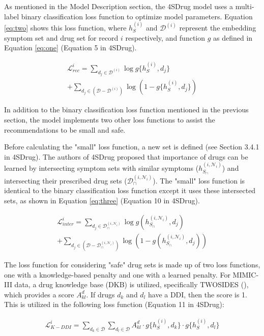 \documentclass[letterpaper]{article} %
\begin{document}
As mentioned in the Model Description section, the 4SDrug model uses a multi-label binary classification loss function to optimize model parameters. Equation \ref{eq:two} shows this loss function, where $h_S^{(i)}$ and $\mathcal{D}^{(i)}$ represent the embedding symptom set and drug set for record $i$ respectively, and function $g$ as defined in Equation \ref{eq:one} (Equation 5 in 4SDrug). 

\begin{multline}
\mathcal{L}_{rec}^{i} = \sum_{d_j\in\mathcal{D}^{(i)}}{\log g\{h_S^{(i)},d_j\}} \quad \\+  \sum_{d_j\in(\mathcal{D}-\mathcal{D}^{(i)})}{\log \left(1-g\{h_S^{(i)},d_j\}\right)}
    \label{eq:two}
\end{multline}

In addition to the binary classification loss function mentioned in the previous section, the model implements two other loss functions to assist the recommendations to be small and safe.

Before calculating the "small" loss function, a new set is defined (see Section 3.4.1 in 4SDrug). The authors of 4SDrug proposed that importance of drugs can be learned by intersecting symptom sets with similar symptoms ($h_{S_{\cap}}^{(i,\mathcal{N}_i)}$) and intersecting their prescribed drug sets ($\mathcal{D}_{\cap}^{(i,\mathcal{N}_i)}$). The "small" loss function is identical to the binary classification loss function except it uses these intersected sets, as shown in Equation \ref{eq:three} (Equation 10 in 4SDrug). 

\begin{multline}
\mathcal{L}_{inter}^{i} = \sum_{d_j\in\mathcal{D}_{\cap}^{(i,\mathcal{N}_i)}}{\log g(h_{S_{\cap}}^{(i,\mathcal{N}_i)},d_j)} \quad \\ + \sum_{d_j\in(\mathcal{D}-\mathcal{D}_{\cap}^{(i,\mathcal{N}_i)})}{\log \left(1-g(h_{S_{\cap}}^{(i,\mathcal{N}_i)},d_j)\right)}
    \label{eq:three}
\end{multline}

The loss function for considering "safe" drug sets is made up of two loss functions, one with a knowledge-based penalty and one with a learned penalty. For MIMIC-III data, a drug knowledge base (DKB) is utilized, specifically TWOSIDES (\cite{twosides}), which provides a score $A^d_{kl}$. If drugs $d_k$ and $d_l$ have a DDI, then the score is 1. This is utilized in the following loss function (Equation 11 in 4SDrug):

\begin{multline}
\mathcal{L}_{K-DDI}^{i} = \sum_{d_k\in\mathcal{D}}\sum_{d_l\in\mathcal{D}}A^d_{kl} \cdot {g\{h_S^{(i)},d_k\}} \cdot {g\{h_S^{(i)},d_l\}}
    \label{eq:kbddi}
\end{multline}
\end{document}
